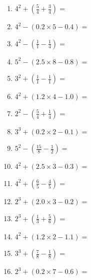 \documentclass[12pt]{article}
\begin{document}
\begin{enumerate}
\item \large $ 4^{2} + (\frac{5}{4} + \frac{3}{4}) = $ \vspace{1.6cm}
\item \large $ 4^{2} - (0.2 \times 5 - 0.4) = $ \vspace{1.6cm}
\item \large $ 4^{2} - (\frac{1}{1} - \frac{1}{4}) = $ \vspace{1.6cm}
\item \large $ 5^{2} - (2.5 \times 8 - 0.8) = $ \vspace{1.6cm}
\item \large $ 3^{2} + (\frac{1}{1} - \frac{1}{1}) = $ \vspace{1.6cm}
\item \large $ 4^{2} + (1.2 \times 4 - 1.0) = $ \vspace{1.6cm}
\newpage
\item \large $ 2^{2} - (\frac{5}{4} + \frac{1}{4}) = $ \vspace{1.6cm}
\item \large $ 3^{3} + (0.2 \times 2 - 0.1) = $ \vspace{1.6cm}
\item \large $ 5^{2} - (\frac{15}{8} - \frac{1}{2}) = $ \vspace{1.6cm}
\item \large $ 4^{2} + (2.5 \times 3 - 0.3) = $ \vspace{1.6cm}
\item \large $ 4^{2} + (\frac{6}{5} - \frac{4}{5}) = $ \vspace{1.6cm}
\item \large $ 2^{3} + (2.0 \times 3 - 0.2) = $ \vspace{1.6cm}
\item \large $ 2^{3} + (\frac{1}{3} + \frac{5}{6}) = $ \vspace{1.6cm}
\item \large $ 4^{2} + (1.2 \times 2 - 1.1) = $ \vspace{1.6cm}
\item \large $ 3^{3} + (\frac{7}{8} - \frac{1}{8}) = $ \vspace{1.6cm}
\item \large $ 2^{3} + (0.2 \times 7 - 0.6) = $ \vspace{1.6cm}
\end{enumerate}\newpage
\end{document}

